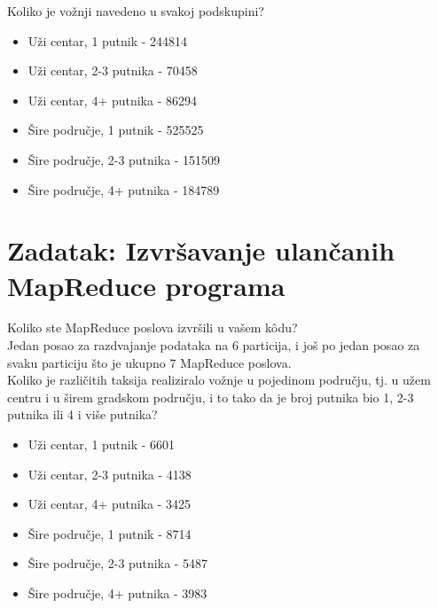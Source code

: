 \documentclass[paper=a4, fontsize=11pt]{scrartcl}
\numberwithin{equation}{section}		%
\numberwithin{figure}{section}			%
\numberwithin{table}{section}				%
\begin{document}
Koliko je vožnji navedeno u svakoj podskupini? 
\begin{itemize}

\item Uži centar, 1 putnik - 244814
\item Uži centar, 2-3 putnika - 70458
\item Uži centar, 4+ putnika - 86294
\item Šire područje, 1 putnik - 525525
\item Šire područje, 2-3 putnika - 151509
\item Šire područje, 4+ putnika - 184789

\end{itemize}

\pagebreak

\section{Zadatak: Izvršavanje ulančanih MapReduce programa}
Koliko ste MapReduce poslova izvršili u vašem kôdu? \\
Jedan posao za razdvajanje podataka na 6 particija, i još po jedan posao za svaku particiju što je ukupno 7 MapReduce poslova.\\

Koliko je različitih taksija realiziralo vožnje u pojedinom području, tj. u užem centru i u širem gradskom području,
i to tako da je broj putnika bio 1, 2-3 putnika ili 4 i više putnika?

\begin{itemize}

\item Uži centar, 1 putnik - 6601
\item Uži centar, 2-3 putnika - 4138
\item Uži centar, 4+ putnika - 3425
\item Šire područje, 1 putnik - 8714
\item Šire područje, 2-3 putnika - 5487
\item Šire područje, 4+ putnika - 3983

\end{itemize}
\end{document}
